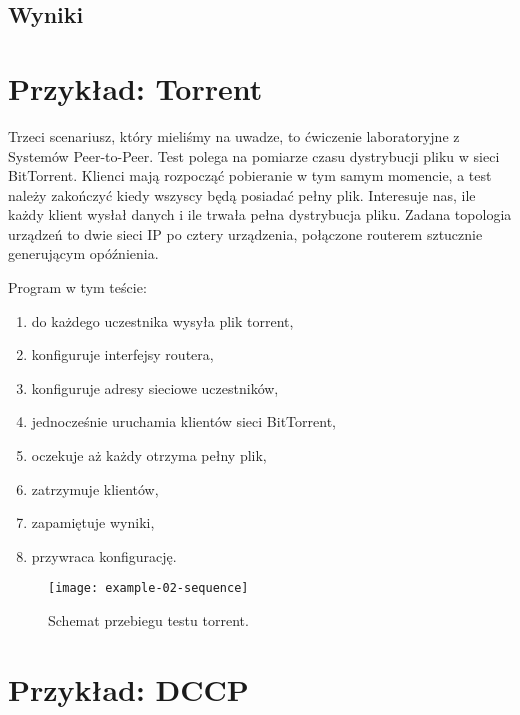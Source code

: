 \documentclass[00-praca-magisterska.tex]{subfiles}
\begin{document}
\subsection{Wyniki}


\section{Przykład: Torrent}


Trzeci scenariusz, który mieliśmy na uwadze, to ćwiczenie laboratoryjne z
Systemów Peer-to-Peer. Test polega na pomiarze czasu dystrybucji pliku w sieci
BitTorrent. Klienci mają rozpocząć pobieranie w tym samym momencie, a test należy
zakończyć kiedy wszyscy będą posiadać pełny plik. Interesuje nas, ile każdy
klient wysłał danych i ile trwała pełna dystrybucja pliku. Zadana topologia
urządzeń to dwie sieci IP po cztery urządzenia, połączone routerem sztucznie
generującym opóźnienia.

Program w tym teście:
\begin{enumerate}
\item do każdego uczestnika wysyła plik torrent,
\item konfiguruje interfejsy routera,
\item konfiguruje adresy sieciowe uczestników,
\item jednocześnie uruchamia klientów sieci BitTorrent,
\item oczekuje aż każdy otrzyma pełny plik,
\item zatrzymuje klientów,
\item zapamiętuje wyniki,
\item przywraca konfigurację.
\end{enumerate}

\begin{figure}[htb]
\begin{center}
\leavevmode
\texttt{[image: example-02-sequence]}
\end{center}
\caption{Schemat przebiegu testu torrent.}
\label{fig:example-02-sequence}
\end{figure}

\section{Przykład: DCCP}
\end{document}

